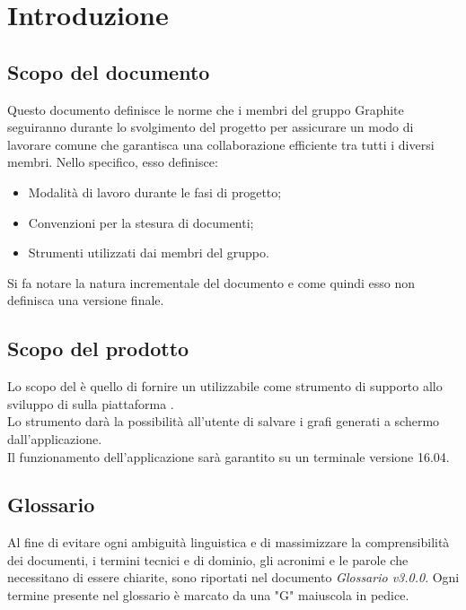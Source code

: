 \documentclass[./NormediProgetto.tex]{subfiles}
\begin{document}
	
\chapter{Introduzione}

\section{Scopo del documento}

Questo documento definisce le norme che i membri del gruppo Graphite seguiranno durante lo svolgimento del progetto per assicurare un modo di lavorare comune che garantisca una collaborazione efficiente tra tutti i diversi
membri. Nello specifico, esso definisce:

\begin{itemize}
	\item Modalità di lavoro durante le fasi di progetto;
	\item Convenzioni per la stesura di documenti;
	\item Strumenti utilizzati dai membri del gruppo.
\end{itemize}
Si fa notare la natura incrementale del documento e come quindi esso non definisca una versione finale.
\section{Scopo del prodotto}

Lo scopo del  è quello di fornire un  utilizzabile come strumento di supporto allo sviluppo di  sulla piattaforma . 
\\ \noindent Lo strumento darà la possibilità all'utente di salvare i grafi generati a schermo dall'applicazione.
\\ \noindent Il funzionamento dell'applicazione sarà garantito su un terminale  versione 16.04.

\section{Glossario}

Al fine di evitare ogni ambiguità linguistica e di massimizzare la comprensibilità dei documenti, i termini tecnici e di dominio, gli acronimi e le parole che necessitano di essere chiarite, sono riportati nel documento \textit{Glossario v3.0.0}.
Ogni termine presente nel glossario è marcato da una "G" maiuscola in pedice.
\end{document}
